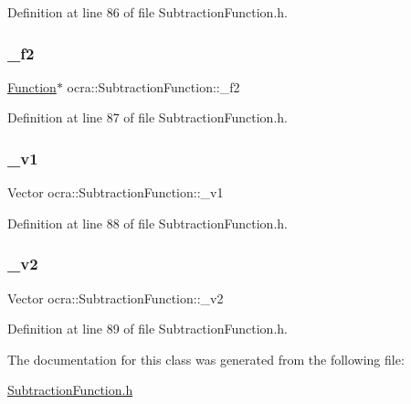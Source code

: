 Definition at line 86 of file Subtraction\+Function.\+h.

\hypertarget{classocra_1_1SubtractionFunction_a22e626b681ffd6b9dd90ec4189ad431c}{}\label{classocra_1_1SubtractionFunction_a22e626b681ffd6b9dd90ec4189ad431c} 
\subsubsection{\texorpdfstring{\+\_\+f2}{\_f2}}
{\footnotesize\ttfamily \hyperlink{classocra_1_1Function}{Function}$\ast$ ocra\+::\+Subtraction\+Function\+::\+\_\+f2\hspace{0.3cm}{\ttfamily [protected]}}



Definition at line 87 of file Subtraction\+Function.\+h.

\hypertarget{classocra_1_1SubtractionFunction_a802ca5db967765779131701423f1b207}{}\label{classocra_1_1SubtractionFunction_a802ca5db967765779131701423f1b207} 
\subsubsection{\texorpdfstring{\+\_\+v1}{\_v1}}
{\footnotesize\ttfamily Vector ocra\+::\+Subtraction\+Function\+::\+\_\+v1\hspace{0.3cm}{\ttfamily [protected]}}



Definition at line 88 of file Subtraction\+Function.\+h.

\hypertarget{classocra_1_1SubtractionFunction_a10736fb0de7f83a54a09055251cf4ad5}{}\label{classocra_1_1SubtractionFunction_a10736fb0de7f83a54a09055251cf4ad5} 
\subsubsection{\texorpdfstring{\+\_\+v2}{\_v2}}
{\footnotesize\ttfamily Vector ocra\+::\+Subtraction\+Function\+::\+\_\+v2\hspace{0.3cm}{\ttfamily [protected]}}



Definition at line 89 of file Subtraction\+Function.\+h.



The documentation for this class was generated from the following file\+:\begin{DoxyCompactItemize}
\item 
\hyperlink{SubtractionFunction_8h}{Subtraction\+Function.\+h}\end{DoxyCompactItemize}
